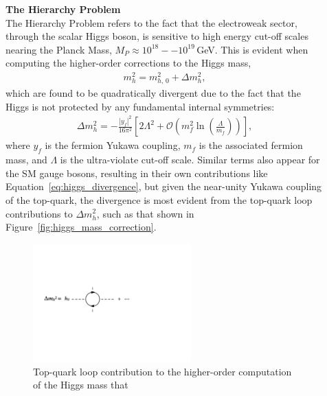 \begin{description}
    \item[] \textbf{The Hierarchy Problem} \\
        The Hierarchy Problem refers to the fact that the electroweak sector, through the scalar Higgs boson,
        is sensitive to high energy cut-off scales nearing the Planck Mass, $M_{P} \approx 10^{18}--10^{19}$\,GeV.
        This is evident when computing the higher-order corrections to the Higgs mass,
        \begin{align*}
            m_h^2 = m_{h,\,0}^2 + \Delta m_h^2,
        \end{align*}
        which are found to be quadratically divergent due to the fact that the Higgs is not protected by any fundamental
        internal symmetries:
        \begin{align}
            \Delta m_h^2 = -\frac{ |y_f|^2 }{16 \pi^2} \left[ 2 \Lambda^2  + \mathcal{O} \left( m_f^2 \ln \left( \frac{\Lambda}{m_f} \right) \right) \right],
            \label{eq:higgs_divergence}
        \end{align}
        where $y_f$ is the fermion Yukawa coupling, $m_f$ is the associated fermion mass, and $\Lambda$ is the
        ultra-violate cut-off scale.
        Similar terms also appear for the SM gauge bosons, resulting in their own contributions like Equation~\ref{eq:higgs_divergence}, but given the near-unity Yukawa coupling of the top-quark,
        the divergence is most evident from the top-quark loop contributions to $\Delta m_h^2$, such as that shown in Figure~\ref{fig:higgs_mass_correction}.
        \begin{figure}[!htb]
        \hspace{1.8cm}
        \begin{minipage}{0.8\textwidth}
            \begin{center}
                \includegraphics[width=0.6\textwidth]{figures/higgs_corr/higgs_mass_correctionsPDF}
                \caption{
                    Top-quark loop contribution to the higher-order computation of the Higgs mass that
}
\end{center}
\end{minipage}
\end{figure}
\end{description}
